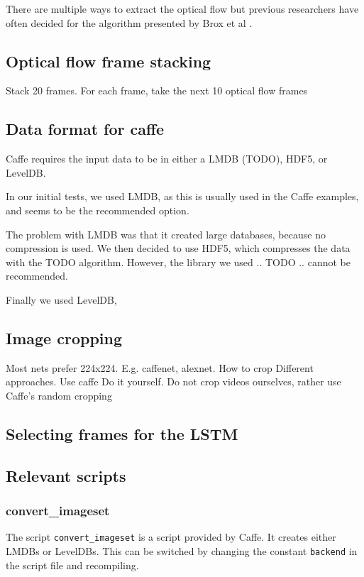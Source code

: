 There are multiple ways to extract the optical flow but previous researchers  have often decided for the algorithm presented by Brox et al \cite{brox2004high}.


\subsection{Optical flow frame stacking}
Stack 20 frames. For each frame, take the next 10 optical flow frames


\subsection{Data format for caffe}
Caffe requires the input data to be in either a LMDB (TODO), HDF5, or LevelDB.

In our initial tests, we used LMDB, as this is usually used in the Caffe examples, and seems to be the recommended option.

The problem with LMDB was that it created large databases, because no compression is used.
We then decided to use HDF5, which compresses the data with the TODO algorithm.
However, the library we used .. TODO .. cannot be recommended.

Finally we used LevelDB,



\subsection{Image cropping}
Most nets prefer 224x224. E.g. caffenet, alexnet.
How to crop
Different approaches.
Use caffe
Do it yourself.
Do not crop videos ourselves, rather use Caffe's random cropping

\subsection{Selecting frames for the LSTM}


\subsection{Relevant scripts}

\subsubsection{convert\_imageset}
The script \texttt{convert\_imageset} is a script provided by Caffe.
It creates either LMDBs or LevelDBs.
This can be switched by changing the constant \texttt{backend} in the script file and recompiling.


